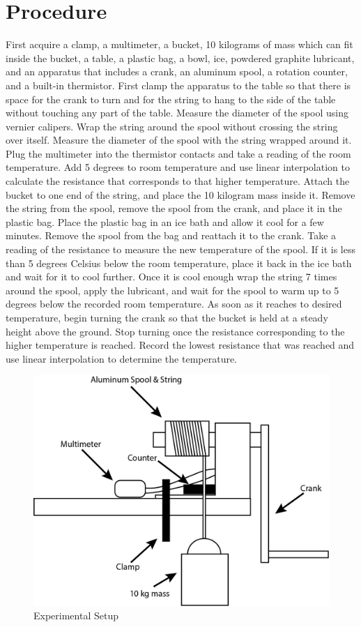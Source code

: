 \documentclass[12pt]{article}
\begin{document}
    \section{Procedure}
        First acquire a clamp, a multimeter, a bucket, 10 kilograms of mass which can fit inside the bucket, a table, a plastic bag, a bowl, ice, powdered graphite lubricant, and an apparatus that includes a crank, an aluminum spool, a rotation counter, and a built-in thermistor. First clamp the apparatus to the table so that there is space for the crank to turn and for the string to hang to the side of the table without touching any part of the table. Measure the diameter of the spool using vernier calipers. Wrap the string around the spool without crossing the string over itself. Measure the diameter of the spool with the string wrapped around it. Plug the multimeter into the thermistor contacts and take a reading of the room temperature. Add 5 degrees to room temperature and use linear interpolation to calculate the resistance that corresponds to that higher temperature. Attach the bucket to one end of the string, and place the 10 kilogram mass inside it. Remove the string from the spool, remove the spool from the crank, and place it in the plastic bag. Place the plastic bag in an ice bath and allow it cool for a few minutes. Remove the spool from the bag and reattach it to the crank. Take a reading of the resistance to measure the new temperature of the spool. If it is less than 5 degrees Celsius below the room temperature, place it back in the ice bath and wait for it to cool further. Once it is cool enough wrap the string 7 times around the spool, apply the lubricant, and wait for the spool to warm up to 5 degrees below the recorded room temperature. As soon as it reaches to desired temperature, begin turning the crank so that the bucket is held at a steady height above the ground. Stop turning once the resistance corresponding to the higher temperature is reached. Record the lowest resistance that was reached and use linear interpolation to determine the temperature.
    \begin{figure}[H]
        \centering
        \includegraphics[width=0.9\linewidth]{4x/Asset 18@4x.png}
        \caption{Experimental Setup}
    \end{figure}
\end{document}
